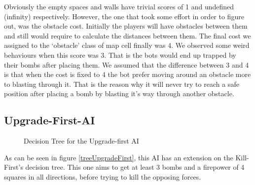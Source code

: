 Obviously the empty spaces and walls have trivial scores of 1 and undefined (infinity) respectively. However, the one that took some effort in order to figure out, was the obstacle cost.
Initially the players will have obstacles between them and still would require to calculate the distances between them. The final cost we assigned to the ‘obstacle’ class of map cell finally was 4. We observed some weird behaviours when this score was 3. That is the bots would end up trapped by their bombs after placing them. We assumed that the difference between 3 and 4 is that when the cost is fixed to 4 the bot prefer moving around an obstacle more to blasting through it. That is the reason why it will never try to reach a safe position after placing a bomb by blasting it’s way through another obstacle.

\subsection{Upgrade-First-AI}
\begin{figure}
\centering
\caption{Decision Tree for the Upgrade-first AI}
\label{fig:treeUpgradeFirst}
\end{figure}
As can be seen in figure \ref{treeUpgradeFirst}, this AI has an extension on the
Kill-First's decision tree. This one aims to get at least 3 bombs and a
firepower of 4 squares in all directions, before trying to kill the opposing
forces.



